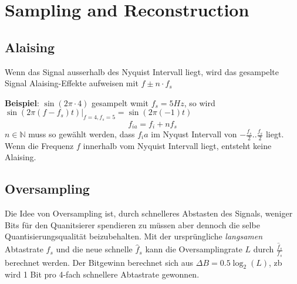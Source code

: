 \section{Sampling and Reconstruction}
\subsection{Alaising}
Wenn das Signal ausserhalb des Nyquist Intervall liegt, wird das gesampelte Signal Alaising-Effekte aufweisen mit $f\pm n\cdot f_s$

\textbf{Beispiel}: $\sin(2\pi \cdot 4)$ gesampelt wmit $f_s = 5Hz$, so wird $\left.\sin(2\pi (f - f_s)t)\right|_{f=4,f_s=5} = \sin(2\pi(-1)t)$
\[
f_{ia} = f_i + nf_s
\]
$n \in \mathbb{N}$ muss so gewählt werden, dass $f_ia$ im Nyqust Intervall von $-\frac{f_s}{2}..\frac{f_s}{2}$ liegt. Wenn die Frequenz $f$ innerhalb vom Nyquist Intervall liegt, entsteht keine Alaising.

\subsection{Oversampling}
Die Idee von Oversampling ist, durch schnelleres Abstasten des Signals, weniger Bits für den Quanitsierer spendieren zu müssen aber dennoch die selbe Quantisierungsqualität beizubehalten. Mit der ursprüngliche \textit{langsamen} Abtastrate $f_s$ und die neue schnelle $\hat{f}_s$ kann die Oversamplingrate $L$ durch $\frac{\hat{f}_s}{f_s}$ berechnet werden. Der Bitgewinn berechnet sich aus $\Delta B = 0.5 \log_2(L)$, zb wird 1 Bit pro 4-fach schnellere Abtastrate gewonnen. 